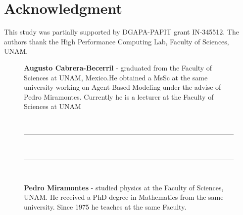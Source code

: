 \documentclass[11pt,a4paper,reqno]{amsart}
\theoremstyle{definition}
\theoremstyle{remark}
\begin{document}
\section{Acknowledgment}
This study was partially supported by DGAPA-PAPIT grant IN-345512. The authors thank the High Performance Computing Lab, Faculty of Sciences, UNAM. 


\bigskip\bigskip\bigskip\bigskip


\nocite{*}



\newpage
\bigskip
\begin{figure}[ht!]
\begin{minipage}[b]{0.5\linewidth}
\vspace{0.1cm}
\qquad\qquad\qquad{}
\end{minipage}
\begin{minipage}[b]{7cm}
\bigskip \bigskip\footnotesize{\textbf{ Augusto Cabrera-Becerril}
        - graduated from the Faculty of Sciences at UNAM, Mexico.He obtained a MsSc at the same university working on Agent-Based Modeling under the advise of Pedro Miramontes. Currently he is a lecturer at the Faculty of Sciences at UNAM}\end{minipage}\\
\end{figure}


\begin{figure}[ht!]
\noindent\rule{\textwidth}{0.5pt}\\[-.8\baselineskip]\rule{\textwidth}{0.5pt}\\
\begin{minipage}[b]{0.5\linewidth}
\vspace{0.1cm}
\qquad\qquad\qquad{}
\end{minipage}
\begin{minipage}[b]{7cm}
\bigskip \bigskip\footnotesize{\textbf{Pedro Miramontes}
        - studied physics at the Faculty of Sciences, UNAM. He received a PhD degree in Mathematics from the same university. Since 1975 he teaches at the same Faculty.}\end{minipage}\\

\end{figure}
\end{document}
